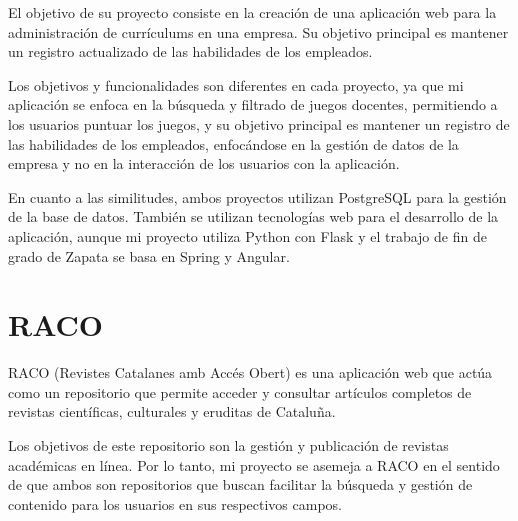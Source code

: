 El objetivo de su proyecto consiste en la creación de una aplicación web para la administración de currículums en una empresa. Su objetivo principal es mantener un registro actualizado de las habilidades de los empleados.

Los objetivos y funcionalidades son diferentes en cada proyecto, ya que mi aplicación se enfoca en la búsqueda y filtrado de juegos docentes, permitiendo a los usuarios puntuar los juegos, y su objetivo principal es mantener un registro de las habilidades de los empleados, enfocándose en la gestión de datos de la empresa y no en la interacción de los usuarios con la aplicación.

En cuanto a las similitudes, ambos proyectos utilizan PostgreSQL para la gestión de la base de datos. También se utilizan tecnologías web para el desarrollo de la aplicación, aunque mi proyecto utiliza Python con Flask y el trabajo de fin de grado de Zapata se basa en Spring y Angular.


\section{RACO}
\cite{RACO} RACO (Revistes Catalanes amb Accés Obert) es una aplicación web que actúa como un repositorio que permite acceder y consultar artículos completos de revistas científicas, culturales y eruditas de Cataluña.

Los objetivos de este repositorio son la gestión y publicación de revistas académicas en línea. Por lo tanto, mi proyecto se asemeja a RACO en el sentido de que ambos son repositorios que buscan facilitar la búsqueda y gestión de contenido para los usuarios en sus respectivos campos.